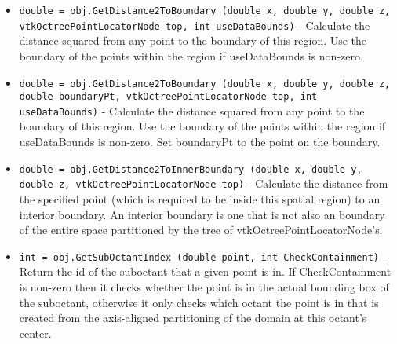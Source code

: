 \begin{itemize}
\item  \verb|double = obj.GetDistance2ToBoundary (double x, double y, double z, vtkOctreePointLocatorNode top, int useDataBounds)| -    Calculate the distance squared from any point to the boundary of this
   region.  Use the boundary of the points within the region if useDataBounds
   is non-zero.

\item  \verb|double = obj.GetDistance2ToBoundary (double x, double y, double z, double boundaryPt, vtkOctreePointLocatorNode top, int useDataBounds)| -    Calculate the distance squared from any point to the boundary of this
   region.  Use the boundary of the points within the region if useDataBounds
   is non-zero.  Set boundaryPt to the point on the boundary.

\item  \verb|double = obj.GetDistance2ToInnerBoundary (double x, double y, double z, vtkOctreePointLocatorNode top)| -    Calculate the distance from the specified point (which is required to
   be inside this spatial region) to an interior boundary.  An interior
   boundary is one that is not also an boundary of the entire space
   partitioned by the tree of vtkOctreePointLocatorNode's.

\item  \verb|int = obj.GetSubOctantIndex (double point, int CheckContainment)| -  Return the id of the suboctant that a given point is in.
 If CheckContainment is non-zero then it checks whether
 the point is in the actual bounding box of the suboctant,
 otherwise it only checks which octant the point is in
 that is created from the axis-aligned partitioning of 
 the domain at this octant's center.

\end{itemize}
